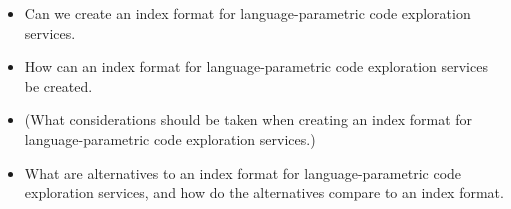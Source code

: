 \begin{itemize}
    \item Can we create an index format for language-parametric code exploration services.
    \item How can an index format for language-parametric code exploration services be created.
    \item (What considerations should be taken when creating an index format for language-parametric code exploration services.)
    \item What are alternatives to an index format for language-parametric code exploration services, and how do the alternatives compare to an index format.
\end{itemize}

%
